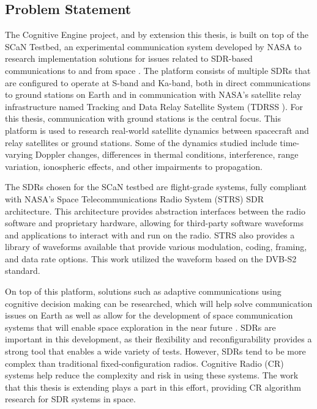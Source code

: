 	\subsection{Problem Statement}
	\par The Cognitive Engine project, and by extension this thesis, is built on top of the SCaN Testbed, an experimental communication system developed by NASA to research implementation solutions for issues related to SDR-based communications to and from space \cite{tim_implementation_paper}. The platform consists of multiple SDRs that are configured to operate at S-band and Ka-band, both in direct communications to ground stations on Earth and in communication with NASA's satellite relay infrastructure named Tracking and Data Relay Satellite System (TDRSS \cite{bricker1990integrated}). For this thesis, communication with ground stations is the central focus. This platform is used to research real-world satellite dynamics between spacecraft and relay satellites or ground stations. Some of the dynamics studied include time-varying Doppler changes, differences in thermal conditions, interference, range variation, ionospheric effects, and other impairments to propagation.
	\par The SDRs chosen for the SCaN testbed are flight-grade systems, fully compliant with NASA's Space Telecommunications Radio System (STRS)\cite{strsRef} SDR architecture. This architecture provides abstraction interfaces between the radio software and proprietary hardware, allowing for third-party software waveforms and applications to interact with and run on the radio. 
	STRS also provides a library of waveforms available that provide various modulation, coding, framing, and data rate options. This work utilized the waveform based on the DVB-S2 standard. 
	\par On top of this platform, solutions such as adaptive communications using cognitive decision making can be researched, which will help solve communication issues on Earth as well as allow for the development of space communication systems that will enable space exploration in the near future \cite{paulo131}. SDRs are important in this development, as their flexibility and reconfigurability provides a strong tool that enables a wide variety of tests. However, SDRs tend to be more complex than traditional fixed-configuration radios. Cognitive Radio (CR) systems help reduce the complexity and risk in using these systems. The work that this thesis is extending plays a part in this effort, providing CR algorithm research for SDR systems in space.    
